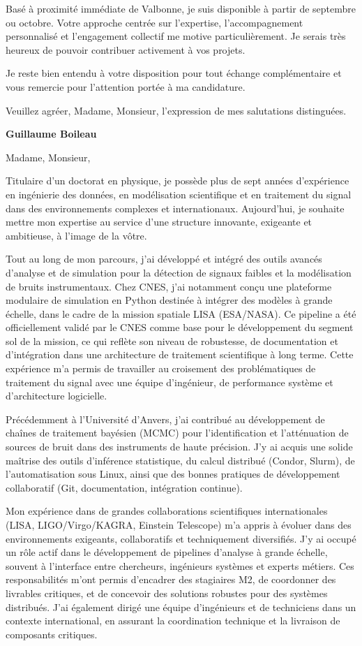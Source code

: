 \documentclass[10pt,a4paper]{altacv}
\begin{document}
{Basé à proximité immédiate de Valbonne, je suis disponible à partir de septembre ou octobre. Votre approche centrée sur l'expertise, l'accompagnement personnalisé et l'engagement collectif me motive particulièrement. Je serais très heureux de pouvoir contribuer activement à vos projets.

Je reste bien entendu à votre disposition pour tout échange complémentaire et vous remercie pour l'attention portée à ma candidature.

Veuillez agréer, Madame, Monsieur, l'expression de mes salutations distinguées.

\textbf{Guillaume Boileau}


Madame, Monsieur,

Titulaire d'un doctorat en physique, je possède plus de sept années d'expérience en ingénierie des données, en modélisation scientifique et en traitement du signal dans des environnements complexes et internationaux. Aujourd'hui, je souhaite mettre mon expertise au service d'une structure innovante, exigeante et ambitieuse, à l'image de la vôtre.

Tout au long de mon parcours, j'ai développé et intégré des outils avancés d'analyse et de simulation pour la détection de signaux faibles et la modélisation de bruits instrumentaux. Chez CNES, j'ai notamment conçu une plateforme modulaire de simulation en Python destinée à intégrer des modèles à grande échelle, dans le cadre de la mission spatiale LISA (ESA/NASA). Ce pipeline a été officiellement validé par le CNES comme base pour le développement du segment sol de la mission, ce qui reflète son niveau de robustesse, de documentation et d'intégration dans une architecture de traitement scientifique à long terme. Cette expérience m'a permis de travailler au croisement des problématiques de traitement du signal avec une équipe d'ingénieur, de performance système et d'architecture logicielle.

Précédemment à l'Université d'Anvers, j'ai contribué au développement de chaînes de traitement bayésien (MCMC) pour l'identification et l'atténuation de sources de bruit dans des instruments de haute précision. J'y ai acquis une solide maîtrise des outils d'inférence statistique, du calcul distribué (Condor, Slurm), de l'automatisation sous Linux, ainsi que des bonnes pratiques de développement collaboratif (Git, documentation, intégration continue).

Mon expérience dans de grandes collaborations scientifiques internationales (LISA, LIGO/Virgo/KAGRA, Einstein Telescope) m'a appris à évoluer dans des environnements exigeants, collaboratifs et techniquement diversifiés. J'y ai occupé un rôle actif dans le développement de pipelines d'analyse à grande échelle, souvent à l'interface entre chercheurs, ingénieurs systèmes et experts métiers. Ces responsabilités m'ont permis d'encadrer des stagiaires M2, de coordonner des livrables critiques, et de concevoir des solutions robustes pour des systèmes distribués. J'ai également dirigé une équipe d'ingénieurs et de techniciens dans un contexte international, en assurant la coordination technique et la livraison de composants critiques.

}
\end{document}
